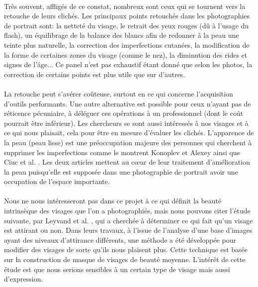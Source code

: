 \documentclass[11pt, french,screen]{report-rd-info}
\begin{document}
\paragraph*{}
Très souvent, affligés de ce constat, nombreux sont ceux qui se tournent vers la retouche de leurs clichés. Les principaux points retouchés dans les photographies de portrait sont: la netteté du visage, le retrait des yeux rouges (dû à l'usage du flash), un équilibrage de la balance des blancs afin de redonner à la peau une teinte plus naturelle, la correction des imperfections cutanées, la modification de la forme de certaines zones du visage (comme le nez), la diminution des rides et signes de l'âge... Ce panel n'est pas exhaustif étant donné que selon les photos, la correction de certains points est plus utile que sur d'autres.
\paragraph*{}
La retouche peut s'avérer coûteuse, surtout en ce qui concerne l'acquisition d'outils performants. Une autre alternative est possible pour ceux n'ayant pas de réticence pécuniaire, à déléguer ces opérations à un professionnel (dont le coût pourrait être inférieur). Les chercheurs se sont aussi intéressés à nos visages et à ce qui nous plaisait, cela pour être en mesure d'évaluer les clichés. L’apparence de la peau (peau lisse) est une préoccupation majeure des personnes qui cherchent à supprimer les imperfections comme le montrent Konoplev et Alexey \cite{Konoplev2012} ainsi que Ciuc et al. \cite{Ciuc2010}. Les deux articles mettent au cœur de leur traitement d'amélioration la peau puisqu'elle est supposée dans une photographie de portrait avoir une occupation de l'espace importante.
\paragraph*{}
Nous ne nous intéresseront pas dans ce projet à ce qui définit la beauté intrinsèque des visages que l'on a photographiés, mais nous pouvons citer l'étude suivante, par Leyvand et al. \cite{Leyvand2008}, qui a cherchée à déterminer ce qui fait qu'un visage est attirant ou non. Dans leurs travaux, à l'issue de l'analyse d'une base d'images ayant des niveaux d'attirance différents,  une méthode a été développée pour modifier des visages de sorte qu'ils nous plaisent plus. Cette technique est basée sur la construction de masque de visages de beauté moyenne. L'intérêt de cette étude est que nous serions sensibles à un certain type de visage mais aussi d'expression.
\end{document}
